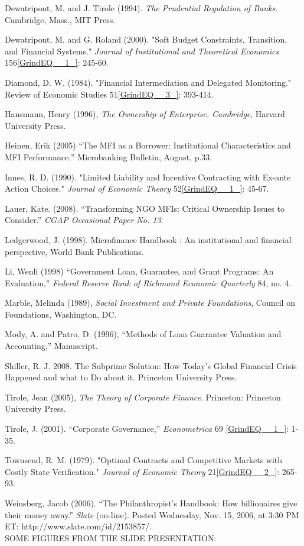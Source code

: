 \documentclass{article} %
\begin{document}
Dewatripont, M. and J. Tirole (1994). \textit{The Prudential Regulation of Banks}. Cambridge, Mass., MIT Press. 

Dewatripont, M. and G. Roland (2000). "Soft Budget Constraints, Transition, and Financial Systems." \textit{Journal of Institutional and Theoretical Economics} 156\eqref{GrindEQ__1_}: 245-60. 

Diamond, D. W. (1984). "Financial Intermediation and Delegated Monitoring." Review of Economic Studies 51\eqref{GrindEQ__3_}: 393-414. 

Hansmann, Henry (1996), \textit{The Ownership of Enterprise. Cambridge}, Harvard University Press. 

Heinen, Erik (2005) ``The MFI as a Borrower: Institutional Characteristics and MFI Performance,'' Microbanking Bulletin, August, p.33. 

Innes, R. D. (1990). "Limited Liability and Incentive Contracting with Ex-ante Action Choices." \textit{Journal of Economic Theory} 52\eqref{GrindEQ__1_}: 45-67. 

Lauer, Kate. (2008). ``Transforming NGO MFIs: Critical Ownership Issues to Consider.'' \textit{CGAP Occasional Paper No. 13}. 

Ledgerwood, J. (1998). Microfinance Handbook : An institutional and financial perspective, World Bank Publications. 

Li, Wenli (1998) ``Government Loan, Guarantee, and Grant Programs: An Evaluation,'' \textit{Federal Reserve Bank of Richmond Economic Quarterly} 84, no. 4. 

Marble, Melinda (1989), \textit{Social Investment and Private Foundations}, Council on Foundations, Washington, DC. 

Mody, A. and Patro, D. (1996), ``Methods of Loan Guarantee Valuation and Accounting,'' Manuscript. 

Shiller, R. J. 2008. The Subprime Solution: How Today's Global Financial Crisis Happened and what to Do about it. Princeton University Press. 

Tirole, Jean (2005), \textit{The Theory of Corporate Finance}. Princeton: Princeton University Press. 

Tirole, J. (2001). ``Corporate Governance,'' \textit{Econometrica} 69 \eqref{GrindEQ__1_}: 1-35. 

Townsend, R. M. (1979). "Optimal Contracts and Competitive Markets with Costly State Verification." \textit{Journal of Economic Theory} 21\eqref{GrindEQ__2_}: 265-93. 

Weinsberg, Jacob (2006). ``The Philanthropist's Handbook: How billionaires give their money away.'' \textit{Slate} (on-line). Posted Wednesday, Nov. 15, 2006, at 3:30 PM ET: http://www.slate.com/id/2153857/. 
\[\mathrm{\qquad }\mathrm{\qquad }\] 
\eject SOME FIGURES FROM THE SLIDE PRESENTATION:
\end{document}
